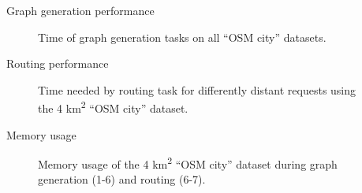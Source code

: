 \documentclass[xcolor={x11names}]{beamer}
\newenvironment{figcenter}
{%
	\parskip=0pt%
	\par%
	\nopagebreak%
	\centering%
}%
{%
	\par%
	\noindent%
	\ignorespacesafterend%
}
\begin{document}
		\begin{frame}{Graph generation performance}
			\begin{figure}
				\begin{figcenter}
					\hspace*{-0.35cm}
					\scalebox{0.7}
					{
						
					}
				\end{figcenter}
				\caption{Time of graph generation tasks on all \enquote{OSM city} datasets.}
			\end{figure}
		\end{frame}
		
		\begin{frame}{Routing performance}
			\begin{figure}
				\begin{figcenter}
					\hspace*{-0.35cm}
					\scalebox{0.7}
					{
						
					}
				\end{figcenter}
				\caption{Time needed by routing task for differently distant requests using the 4 km\textsuperscript{2} \enquote{OSM city} dataset.}
			\end{figure}
		\end{frame}
		
		\begin{frame}{Memory usage}
			\begin{figure}
				\begin{figcenter}
					\hspace*{-0.35cm}
					\scalebox{0.7}
					{
						
					}
				\end{figcenter}
				\caption{Memory usage of the 4 km\textsuperscript{2} \enquote{OSM city} dataset during graph generation (1-6) and routing (6-7).}
			\end{figure}
		\end{frame}
		
\end{document}
